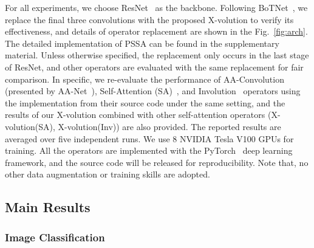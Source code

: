 \documentclass{article}
\begin{document}
For all experiments, we choose ResNet~\cite{DBLP:conf/cvpr/HeZRS16} as the backbone. Following BoTNet~\cite{DBLP:journals/corr/abs-2101-11605}, we replace the final three  convolutions with the proposed X-volution to verify its effectiveness, and details of operator replacement are shown in the Fig.~\ref{fig:arch}. The detailed implementation of PSSA can be found in the supplementary material. Unless otherwise specified, the replacement only occurs in the last stage of ResNet, and other operators are evaluated with the same replacement for fair comparison. 
In specific, we re-evaluate the performance of AA-Convolution (presented by AA-Net~\cite{DBLP:conf/iccv/BelloZLVS19}), Self-Attention (SA)~\cite{DBLP:conf/nips/VaswaniSPUJGKP17}, and Involution~\cite{DBLP:journals/corr/abs-2103-06255} operators using the implementation from their source code under the same setting, and the results of our X-volution combined with other self-attention operators (X-volution(SA), X-volution(Inv)) are also provided. The reported results are averaged over five independent runs.
We use 8 NVIDIA Tesla V100 GPUs for training. 
All the operators are implemented with the PyTorch~\cite{DBLP:conf/nips/PaszkeGMLBCKLGA19} deep learning framework, and the source code will be released for reproducibility. 
Note that, no other data augmentation or training skills are adopted.

\vspace{-1mm}
\subsection{Main Results}

\subsubsection{Image Classification}
\end{document}
